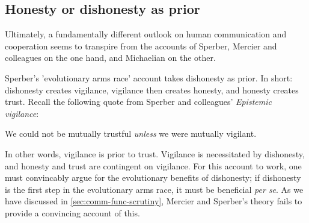 
\subsection{Honesty or dishonesty as prior}
\label{sec:honesty-dishonesty}

Ultimately, a fundamentally different outlook on human communication and cooperation seems to transpire from the accounts of Sperber, Mercier and colleagues on the one hand, and Michaelian on the other.

Sperber's 'evolutionary arms race' account takes dishonesty as prior.
In short: dishonesty creates vigilance, vigilance then creates honesty, and honesty creates trust. Recall the following quote from Sperber and colleagues' \emph{Epistemic vigilance}:
\begin{quoting}
    We could not be mutually trustful \emph{unless} we were mutually vigilant.
    \hfill \citep[p.~364]{Sperber10}
\end{quoting}
In other words, vigilance is prior to trust. Vigilance is necessitated by dishonesty, and honesty and trust are contingent on vigilance.
For this account to work, one must convincably argue for the evolutionary benefits of dishonesty; if dishonesty is the first step in the evolutionary arms race, it must be beneficial \emph{per se}. As we have discussed in \cref{sec:comm-func-scrutiny}, Mercier and Sperber's theory fails to provide a convincing account of this.

